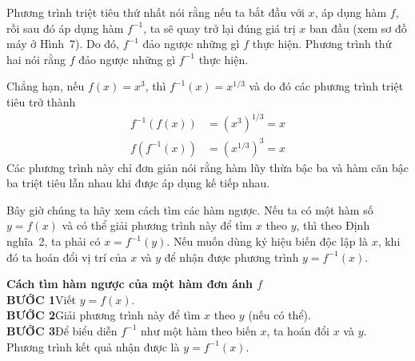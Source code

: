 \begin{minipage}[t]{0.708\textwidth}
    \vspace{4pt}
    Phương trình triệt tiêu thứ nhất nói rằng nếu ta bắt đầu với $x$, áp dụng hàm $f$, rồi sau đó áp dụng hàm $f^{-1}$, ta sẽ quay trở lại đúng giá trị $x$ ban đầu (xem sơ đồ máy ở Hình~7). Do đó, $f^{-1}$ đảo ngược những gì $f$ thực hiện. Phương trình thứ hai nói rằng $f$ đảo ngược những gì $f^{-1}$ thực hiện.

    \vspace{6pt}
    Chẳng hạn, nếu $f(x) = x^3$, thì $f^{-1}(x) = x^{1/3}$ và do đó các phương trình triệt tiêu trở thành
    \begin{align*}
        f^{-1}(f(x)) &= (x^3)^{1/3} = x \\
        f(f^{-1}(x)) &= (x^{1/3})^3 = x
    \end{align*}
    Các phương trình này chỉ đơn giản nói rằng hàm lũy thừa bậc ba và hàm căn bậc ba triệt tiêu lẫn nhau khi được áp dụng kế tiếp nhau.

    \vspace{6pt}
    Bây giờ chúng ta hãy xem cách tìm các hàm ngược. Nếu ta có một hàm số $y = f(x)$ và có thể giải phương trình này để tìm $x$ theo $y$, thì theo Định nghĩa~2, ta phải có $x = f^{-1}(y)$. Nếu muốn dùng ký hiệu biến độc lập là $x$, khi đó ta hoán đổi vị trí của $x$ và $y$ để nhận được phương trình $y = f^{-1}(x)$.

    \vspace{6pt}
    \begin{tcolorbox}[colframe=stewartred, colback=white, boxrule=0.8pt, arc=0mm, left=10pt, right=10pt, top=8pt, bottom=8pt]
    \noindent
    \hspace{6pt}\textbf{\textsf{\color{stewartred}Cách tìm hàm ngược của một hàm đơn ánh $f$}}\\[6pt]
    \textbf{\textsf{BƯỚC 1}}\quad Viết $y = f(x)$.\\[4pt]
    \textbf{\textsf{BƯỚC 2}}\quad Giải phương trình này để tìm $x$ theo $y$ (nếu có thể).\\[4pt]
    \textbf{\textsf{BƯỚC 3}}\quad Để biểu diễn $f^{-1}$ như một hàm theo biến $x$, ta hoán đổi $x$ và $y$.\\
    Phương trình kết quả nhận được là $y = f^{-1}(x)$.
    \end{tcolorbox}
\end{minipage}